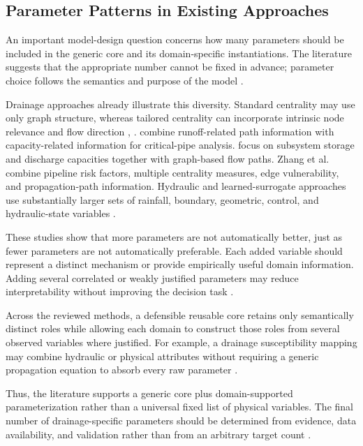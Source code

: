 \subsection{Parameter Patterns in Existing
Approaches}\label{parameter-patterns-in-existing-approaches}

An important model-design question concerns how many parameters should
be included in the generic core and its domain-specific instantiations.
The literature suggests that the
appropriate number cannot be fixed in advance; parameter choice follows
the semantics and purpose of the model \citep{simone2022,dastgir2023,
meijer2023,zhang2024,zhang2025}.

Drainage approaches already illustrate this diversity. Standard
centrality may use only graph structure, whereas tailored centrality can
incorporate intrinsic node relevance and flow direction \citep{simone2022},
\citep{simone2023}. \citet{dastgir2023} combine runoff-related path
information with capacity-related information for critical-pipe
analysis. \citet{meijer2023} focus on subsystem storage and
discharge capacities together with graph-based flow paths. Zhang et al.
\citep{zhang2025} combine pipeline risk factors, multiple centrality measures,
edge vulnerability, and propagation-path information. Hydraulic and
learned-surrogate approaches use substantially larger sets of rainfall,
boundary, geometric, control, and hydraulic-state variables \citep{zhang2024}.

These studies show that more parameters are not automatically better,
just as fewer parameters are not automatically preferable. Each added
variable should represent a distinct mechanism or provide empirically
useful domain information. Adding several correlated or weakly justified
parameters may reduce interpretability without improving the decision
task \citep{simone2022,dastgir2023,meijer2023,zhang2024}.

Across the reviewed methods, a defensible reusable core retains only
semantically distinct roles while allowing each domain to construct those
roles from several observed variables where justified. For example, a
drainage susceptibility mapping may combine hydraulic or physical
attributes without requiring a generic propagation equation to absorb
every raw parameter \citep{dastgir2023,meijer2023,zhang2025}.

Thus, the literature supports a generic core plus domain-supported
parameterization rather than a universal fixed list of physical
variables. The final number of drainage-specific parameters should be
determined from evidence, data availability, and validation rather than
from an arbitrary target count \citep{simone2022,dastgir2023,zhang2024}.


